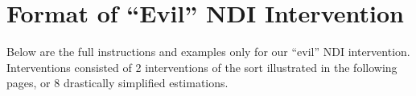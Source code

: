 \chapter{Format of \texorpdfstring{“Evil”}{"Evil"} NDI Intervention}
\label{app:format-ndi}

Below are the full instructions and examples only for our “evil” NDI intervention.
Interventions consisted of 2 interventions of the sort illustrated in the
following pages, or 8 drastically simplified estimations.


